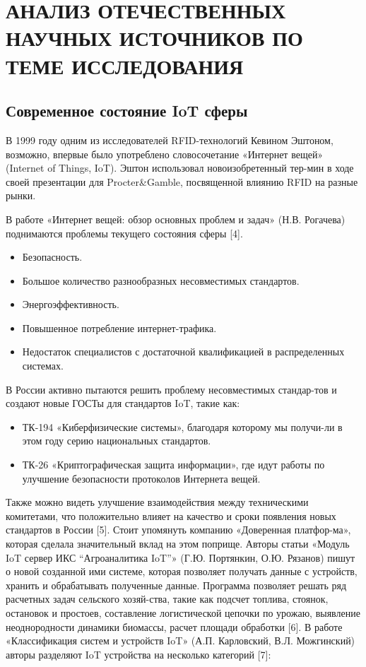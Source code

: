 \section{АНАЛИЗ ОТЕЧЕСТВЕННЫХ НАУЧНЫХ ИСТОЧНИКОВ ПО ТЕМЕ ИССЛЕДОВАНИЯ}


\subsection{Современное состояние IoT сферы}

В 1999 году одним из исследователей RFID-технологий Кевином Эштоном, возможно, впервые было употреблено словосочетание «Интернет вещей» (Internet of Things, IoT). Эштон использовал новоизобретенный тер-мин в ходе своей презентации для Procter\&Gamble, посвященной влиянию RFID на разные рынки.

В работе «Интернет вещей: обзор основных проблем и задач» (Н.В. Рогачева) поднимаются проблемы текущего состояния сферы [4].

\begin{itemize}
    \item Безопасность.
    \item Большое количество разнообразных несовместимых стандартов.
    \item Энергоэффективность.
    \item Повышенное потребление интернет-трафика.
    \item Недостаток специалистов с достаточной квалификацией в распределенных системах.
\end{itemize}


В России активно пытаются решить проблему
несовместимых стандар-тов и создают новые ГОСТы для стандартов IoT, такие как: 

\begin{itemize}
    \item ТК-194 «Киберфизические системы»,
    благодаря которому мы получи-ли в этом году серию национальных стандартов.
    \item ТК-26 «Криптографическая защита
    информации», где идут работы по улучшение безопасности протоколов Интернета вещей.
\end{itemize}

Также можно видеть улучшение взаимодействия между техническими комитетами, что положительно влияет на качество и сроки появления новых стандартов в России [5]. Стоит упомянуть компанию «Доверенная платфор-ма», которая сделала значительный вклад на этом поприще. Авторы статьи «Модуль IoT сервер ИКС “Агроаналитика IoT”» (Г.Ю. Портянкин, О.Ю. Рязанов) пишут о новой созданной ими системе, которая позволяет получать данные с устройств, хранить и обрабатывать полученные данные. Программа позволяет решать ряд расчетных задач сельского хозяй-ства, такие как подсчет топлива, стоянок, остановок и простоев, составление
логистической цепочки по урожаю, выявление неоднородности динамики биомассы, расчет площади обработки [6]. В работе
«Классификация систем и устройств IoT» (А.П. Карловский, В.Л. Можгинский) авторы разделяют IoT устройства на несколько
категорий [7]:

